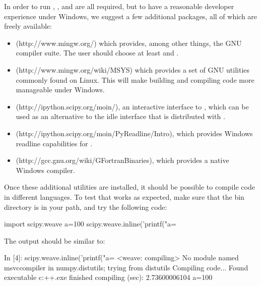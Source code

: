 \documentclass[article]{jss}
\begin{document}
In order to run , ,  and
 are all required, but to have a reasonable developer
experience under Windows, we suggest a few additional packages, all of
which are freely available:
\begin{itemize}
\item {} (http://www.mingw.org/) which provides, among other
  things, the GNU compiler suite. The user should choose at least
   and .
\item {} (http://www.mingw.org/wiki/MSYS) which provides a set
  of GNU utilities commonly found on Linux. This will make building
  and compiling code more manageable under Windows.
\item {} (http://ipython.scipy.org/moin/), an interactive
  interface to , which can be used as an alternative
  to the idle interface that is distributed with .
\item {}
  (http://ipython.scipy.org/moin/PyReadline/Intro), which provides
  Windows readline capabilities for .
\item {} (http://gcc.gnu.org/wiki/GFortranBinaries), which
  provides a native Windows  compiler.
\end{itemize}
Once these additional utilities are installed, it should be possible
to compile code in different languages. To test that  works
as expected, make sure that the  bin directory is in your
path, and try the following code:


\begin{Code}
import scipy.weave 
a=100 
scipy.weave.inline('printf("a=%
\end{Code}


The output should be similar to:


\begin{Code}
In [4]: scipy.weave.inline('printf("a=%
<weave: compiling>
No module named msvccompiler in numpy.distutils; trying from distutils
Compiling code...
Found executable c:\mingw\bin\g++.exe
finished compiling (sec):  2.73600006104
a=100
\end{Code}
\end{document}

